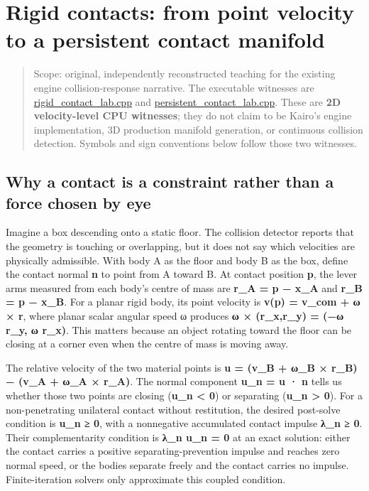 \hypertarget{appendix-c9d92e145503}{}\label{referencestart:appendix-c9d92e145503}
\section{Rigid contacts: from point velocity to a persistent contact manifold}\label{appendix-c9d92e145503-rigid-contacts-from-point-velocity-to-a-persistent-contact-manifold}

\hypertarget{appendix-c9d92e145503-rigid-contacts-from-point-velocity-to-a-persistent-contact-manifold}{}

\begin{quote}
Scope: original, independently reconstructed teaching for the existing engine collision-response narrative. The executable witnesses are \hyperref[source-file-103f7ae75398744dea475e34]{rigid\_contact\_lab.cpp} and \hyperref[source-file-44c320ffad9698c7abd453e2]{persistent\_contact\_lab.cpp}. These are \textbf{2D velocity-level CPU witnesses}; they do not claim to be Kairo's engine implementation, 3D production manifold generation, or continuous collision detection. Symbols and sign conventions below follow those two witnesses.
\end{quote}

\subsection{Why a contact is a constraint rather than a force chosen by eye}\label{appendix-c9d92e145503-why-a-contact-is-a-constraint-rather-than-a-force-chosen-by-eye}

\hypertarget{appendix-c9d92e145503-why-a-contact-is-a-constraint-rather-than-a-force-chosen-by-eye}{}

Imagine a box descending onto a static floor. The collision detector reports that the geometry is touching or overlapping, but it does not say which velocities are physically admissible. With body A as the floor and body B as the box, define the contact normal \textbf{n} to point from A toward B. At contact position \textbf{p}, the lever arms measured from each body's centre of mass are \textbf{r\_A = p − x\_A} and \textbf{r\_B = p − x\_B}. For a planar rigid body, its point velocity is \textbf{v(p) = v\_com + ω × r}, where planar scalar angular speed ω produces \textbf{ω × (r\_x,r\_y) = (−ω r\_y, ω r\_x)}. This matters because an object rotating toward the floor can be closing at a corner even when the centre of mass is moving away.

The relative velocity of the two material points is \textbf{u = (v\_B + ω\_B × r\_B) − (v\_A + ω\_A × r\_A)}. The normal component \textbf{u\_n = u · n} tells us whether those two points are closing (\textbf{u\_n \textless{} 0}) or separating (\textbf{u\_n \textgreater{} 0}). For a non-penetrating unilateral contact without restitution, the desired post-solve condition is \textbf{u\_n ≥ 0}, with a nonnegative accumulated contact impulse \textbf{λ\_n ≥ 0}. Their complementarity condition is \textbf{λ\_n u\_n = 0} at an exact solution: either the contact carries a positive separating-prevention impulse and reaches zero normal speed, or the bodies separate freely and the contact carries no impulse. Finite-iteration solvers only approximate this coupled condition.

